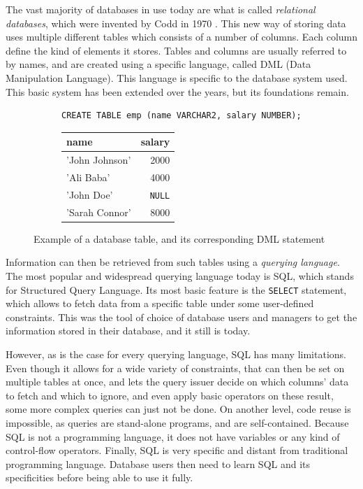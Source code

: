 \documentclass[twoside,11pt,a4paper]{article}
\newcommand{\sql}[1]{\texttt{#1}}
\newcommand{\pls}[1]{\texttt{#1}}
\newcommand{\plsnull}{\pls{NULL}}
\begin{document}
The vast majority of databases in use today are what is called \textit{relational databases}, which were invented by Codd in 1970 \cite{codd70}. This new way of storing data uses multiple different tables which consists of a number of columns. Each column define the kind of elements it stores. Tables and columns are usually referred to by names, and are created using a specific language, called DML (Data Manipulation Language). This language is specific to the database system used. This basic system has been extended over the years, but its foundations remain.

\begin{figure}[hb]
	\centering
	
	\begin{subfigure}[h]{\textwidth}
		\centering
		\begin{lstlisting}[style=SQL]
CREATE TABLE emp (name VARCHAR2, salary NUMBER);
		\end{lstlisting}
	\end{subfigure}
	
	
	\begin{subfigure}[h]{\textwidth}
		\centering
		\begin{tabular}{| l | r |}
			\hline
			name & salary \\
			\hline
			'John Johnson' & 2000 \\
			'Ali Baba' & 4000 \\
			'John Doe' & \plsnull{} \\
			'Sarah Connor' & 8000 \\
			\hline
		\end{tabular}
	\end{subfigure}

	\caption{Example of a database table, and its corresponding DML statement}
	
\end{figure}

Information can then be retrieved from such tables using a \textit{querying language}. The most popular and widespread querying language today is SQL, which stands for Structured Query Language. Its most basic feature is the \sql{SELECT} statement, which allows to fetch data from a specific table under some user-defined constraints. This was the tool of choice of database users and managers to get the information stored in their database, and it still is today.

However, as is the case for every querying language, SQL has many limitations. Even though it allows for a wide variety of constraints, that can then be set on multiple tables at once, and lets the query issuer decide on which columns' data to fetch and which to ignore, and even apply basic operators on these result, some more complex queries can just not be done. On another level, code reuse is impossible, as queries are stand-alone programs, and are self-contained. Because SQL is not a programming language, it does not have variables or any kind of control-flow operators. Finally, SQL is very specific and distant from traditional programming language. Database users then need to learn SQL and its specificities before being able to use it fully.
\end{document}
